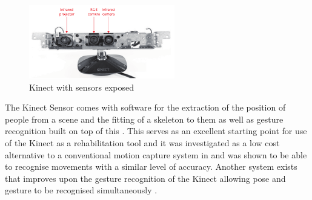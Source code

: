 \documentclass[journal]{IEEEtran}
\begin{document}
\begin{figure}[!h]
\centering
\includegraphics[width=2.5in]{kinect.png}
\caption{Kinect with sensors exposed \cite{Kinect}}
\label{kinect_fig}
\end{figure}

The Kinect Sensor comes with software for the extraction of the position of people from a scene and 
the fitting of a skeleton to them as well as gesture recognition built on top of this \cite{Kinect,kinect1}. 
This serves as an excellent starting point for use of the Kinect as a rehabilitation tool and it was 
investigated as a low cost alternative to a conventional motion capture system in \cite{kinect1} and was 
shown to be able to recognise movements with a similar level of accuracy. Another system exists that 
improves upon the gesture recognition of the Kinect allowing pose and gesture to be recognised 
simultaneously \cite{kinectGesture}.

%
%

\end{document}
